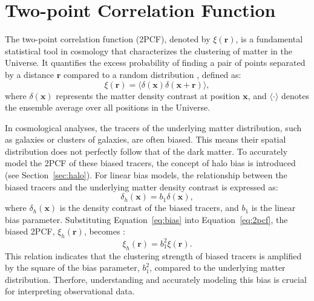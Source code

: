 \section{Two-point Correlation Function}
The two-point correlation function (2PCF), denoted by $\xi(\mathbf{r})$, is a fundamental statistical tool in cosmology that characterizes the clustering of matter in the Universe. It quantifies the excess probability of finding a pair of points separated by a distance $\mathbf{r}$ compared to a random distribution \citep{2002PhR...367....1B}, defined as:
\begin{equation}
    \xi(\mathbf{r}) = \langle \delta(\mathbf{x}) \delta(\mathbf{x} + \mathbf{r}) \rangle,
    \label{eq:2pcf}
\end{equation}
where $\delta(\mathbf{x})$ represents the matter density contrast at position $\mathbf{x}$, and $\langle \cdot \rangle$ denotes the ensemble average over all positions in the Universe. 

In cosmological analyses, the tracers of the underlying matter distribution, such as galaxies or clusters of galaxies, are often biased. This means their spatial distribution does not perfectly follow that of the dark matter. To accurately model the 2PCF of these biased tracers, the concept of halo bias is introduced (see Section~\ref{sec:halo}). For linear bias models, the relationship between the biased tracers and the underlying matter density contrast is expressed as:
\begin{equation}
    \delta_h(\mathbf{x}) = b_1 \delta(\mathbf{x}),
    \label{eq:bias}
\end{equation}
where $\delta_h(\mathbf{x})$ is the density contrast of the biased tracers, and $b_1$ is the linear bias parameter. Substituting Equation~\eqref{eq:bias} into Equation~\eqref{eq:2pcf}, the biased 2PCF, $\xi_h(\mathbf{r})$, becomes \citep{1996MNRAS.282..347M}:
\begin{equation}
    \xi_h(\mathbf{r}) = b_1^2 \xi(\mathbf{r}).
    \label{eq:bias_2pcf}
\end{equation}
This relation indicates that the clustering strength of biased tracers is amplified by the square of the bias parameter, $b_1^2$, compared to the underlying matter distribution. Therfore, understanding and accurately modeling this bias is crucial for interpreting observational data.

